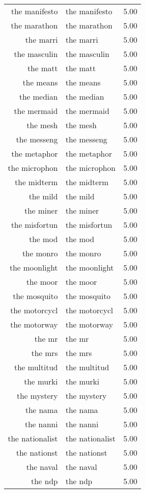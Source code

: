 \begin{table}[ht]
\begin{tabular}{rlr}
  the manifesto & the manifesto & 5.00 \\ 
  the marathon & the marathon & 5.00 \\ 
  the marri & the marri & 5.00 \\ 
  the masculin & the masculin & 5.00 \\ 
  the matt & the matt & 5.00 \\ 
  the means & the means & 5.00 \\ 
  the median & the median & 5.00 \\ 
  the mermaid & the mermaid & 5.00 \\ 
  the mesh & the mesh & 5.00 \\ 
  the messeng & the messeng & 5.00 \\ 
  the metaphor & the metaphor & 5.00 \\ 
  the microphon & the microphon & 5.00 \\ 
  the midterm & the midterm & 5.00 \\ 
  the mild & the mild & 5.00 \\ 
  the miner & the miner & 5.00 \\ 
  the misfortun & the misfortun & 5.00 \\ 
  the mod & the mod & 5.00 \\ 
  the monro & the monro & 5.00 \\ 
  the moonlight & the moonlight & 5.00 \\ 
  the moor & the moor & 5.00 \\ 
  the mosquito & the mosquito & 5.00 \\ 
  the motorcycl & the motorcycl & 5.00 \\ 
  the motorway & the motorway & 5.00 \\ 
  the mr & the mr & 5.00 \\ 
  the mrs & the mrs & 5.00 \\ 
  the multitud & the multitud & 5.00 \\ 
  the murki & the murki & 5.00 \\ 
  the mystery & the mystery & 5.00 \\ 
  the nama & the nama & 5.00 \\ 
  the nanni & the nanni & 5.00 \\ 
  the nationalist & the nationalist & 5.00 \\ 
  the nationst & the nationst & 5.00 \\ 
  the naval & the naval & 5.00 \\ 
  the ndp & the ndp & 5.00 \\ 

\end{tabular}
\end{table}
